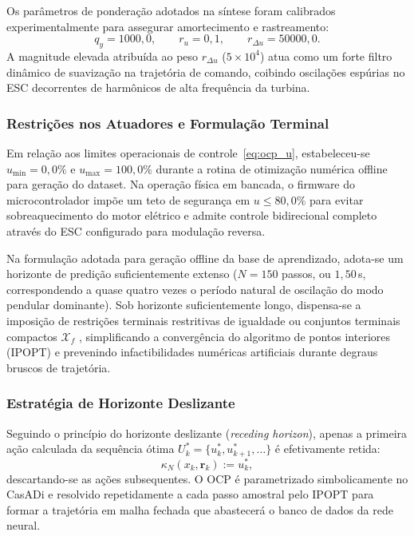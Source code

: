 Os parâmetros de ponderação adotados na síntese foram calibrados experimentalmente para assegurar amortecimento e rastreamento:
\begin{equation}
    q_y = 1000{,}0, \qquad r_u = 0{,}1, \qquad r_{\Delta u} = 50000{,}0.
    \label{eq:pesos_nmpc}
\end{equation}
A magnitude elevada atribuída ao peso $r_{\Delta u}$ ($5 \times 10^4$) atua como um forte filtro dinâmico de suavização na trajetória de comando, coibindo oscilações espúrias no ESC decorrentes de harmônicos de alta frequência da turbina.

\subsubsection*{Restrições nos Atuadores e Formulação Terminal}

Em relação aos limites operacionais de controle~\eqref{eq:ocp_u}, estabeleceu-se $u_{\min} = 0{,}0\%$ e $u_{\max} = 100{,}0\%$ durante a rotina de otimização numérica offline para geração do dataset. Na operação física em bancada, o firmware do microcontrolador impõe um teto de segurança em $u \le 80{,}0\%$ para evitar sobreaquecimento do motor elétrico e admite controle bidirecional completo através do ESC configurado para modulação reversa.

Na formulação adotada para geração offline da base de aprendizado, adota-se um horizonte de predição suficientemente extenso ($N = 150$ passos, ou $1{,}50$\,s, correspondendo a quase quatro vezes o período natural de oscilação do modo pendular dominante). Sob horizonte suficientemente longo, dispensa-se a imposição de restrições terminais restritivas de igualdade ou conjuntos terminais compactos $\mathcal{X}_f$ \cite{rawlings2017}, simplificando a convergência do algoritmo de pontos interiores (IPOPT) e prevenindo infactibilidades numéricas artificiais durante degraus bruscos de trajetória.

\subsubsection*{Estratégia de Horizonte Deslizante}

Seguindo o princípio do horizonte deslizante (\textit{receding horizon}), apenas a primeira ação calculada da sequência ótima $U_k^* = \{u_k^*, u_{k+1}^*, \dots\}$ é efetivamente retida:
\begin{equation}
    \kappa_N(x_k, \mathbf{r}_k) := u_k^*,
    \label{eq:lei_controle}
\end{equation}
\noindent descartando-se as ações subsequentes. O OCP é parametrizado simbolicamente no CasADi e resolvido repetidamente a cada passo amostral pelo IPOPT para formar a trajetória em malha fechada que abastecerá o banco de dados da rede neural.

